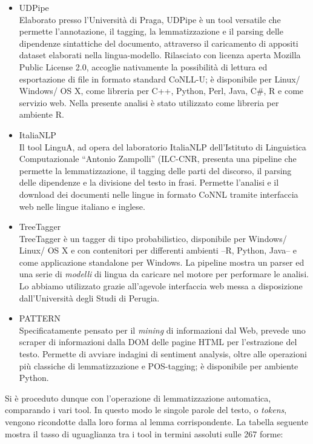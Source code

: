 \begin{itemize}
\item
  UDPipe \autocite{udpipe2017}\\
  Elaborato presso l'Università di Praga, UDPipe è un tool versatile che
  permette l'annotazione, il tagging, la lemmatizzazione e il parsing
  delle dipendenze sintattiche del documento, attraverso il caricamento
  di appositi dataset elaborati nella lingua-modello. Rilasciato con
  licenza aperta Mozilla Public License 2.0, accoglie nativamente la
  possibilità di lettura ed esportazione di file in formato standard
  CoNLL-U; è disponibile per Linux/ Windows/ OS X, come libreria per
  C++, Python, Perl, Java, C\#, R e come servizio web. Nella presente
  analisi è stato utilizzato come libreria per ambiente R.
\item
  ItaliaNLP \autocite{attardi-et-al2009}\\
  Il tool LinguA, ad opera del laboratorio ItaliaNLP dell'Istituto di
  Linguistica Computazionale ``Antonio Zampolli'' (ILC-CNR, presenta una
  pipeline che permette la lemmatizzazione, il tagging delle parti del
  discorso, il parsing delle dipendenze e la divisione del testo in
  frasi. Permette l'analisi e il download dei documenti nelle lingue in
  formato CoNNL tramite interfaccia web nelle lingue italiano e inglese.
\item
  TreeTagger \autocite{schmid1994b}\\
  TreeTagger è un tagger di tipo probabilistico, disponibile per
  Windows/ Linux/ OS X e con contenitori per differenti ambienti --R,
  Python, Java-- e come applicazione standalone per Windows. La pipeline
  mostra un parser ed una serie di \emph{modelli} di lingua da caricare
  nel motore per performare le analisi. Lo abbiamo utilizzato grazie
  all'agevole interfaccia web messa a disposizione dall'Università degli
  Studi di Perugia.
\item
  PATTERN \autocite{pattern2012}\\
  Specificatamente pensato per il \emph{mining} di informazioni dal Web,
  prevede uno scraper di informazioni dalla DOM delle pagine HTML per
  l'estrazione del testo. Permette di avviare indagini di sentiment
  analysis, oltre alle operazioni più classiche di lemmatizzazione e
  POS-tagging; è disponibile per ambiente Python.
\end{itemize}

Si è proceduto dunque con l'operazione di lemmatizzazione automatica,
comparando i vari tool. In questo modo le singole parole del testo, o
\emph{tokens}, vengono ricondotte dalla loro forma al lemma
corrispondente. La tabella seguente mostra il tasso di uguaglianza tra i
tool in termini assoluti sulle 267 forme:

